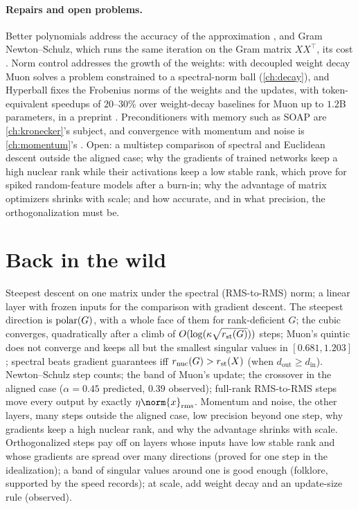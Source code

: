 \begin{refsection}
\paragraph{Repairs and open problems.} Better polynomials address the accuracy of the approximation \parencite{AmselEtAl2026}, and Gram Newton--Schulz, which runs the same iteration on the Gram matrix $XX^\top$, its cost \parencite{ZhangEtAl2026Gram}. Norm control addresses the growth of the weights: with decoupled weight decay Muon solves a problem constrained to a spectral-norm ball \parencite{ChenLiLiu2026,PethickEtAl2025} (\cref{ch:decay}), and Hyperball fixes the Frobenius norms of the weights and the updates, with token-equivalent speedups of $20$--$30\%$ over weight-decay baselines for Muon up to $1.2$B parameters, in a preprint \parencite{WenEtAl2026Hyperball}. Preconditioners with memory such as SOAP \parencite{VyasEtAl2025} are \cref{ch:kronecker}'s subject, and convergence with momentum and noise is \cref{ch:momentum}'s \parencite{LiHong2025,Kovalev2025}. Open: a multistep comparison of spectral and Euclidean descent outside the aligned case; why the gradients of trained networks keep a high nuclear rank while their activations keep a low stable rank, which \textcite{DavisDrusvyatskiy2025} prove for spiked random-feature models after a burn-in; why the advantage of matrix optimizers shrinks with scale; and how accurate, and in what precision, the orthogonalization must be.

\section{Back in the wild}\label{sec:spectral:back}

{Steepest descent on one matrix under the spectral (RMS-to-RMS) norm; a linear layer with frozen inputs for the comparison with gradient descent.}
{The steepest direction is $\operatorname{polar}(G)$, with a whole face of them for rank-deficient $G$; the cubic converges, quadratically after a climb of $O(\log(\kappa\sqrt{r_{\mathrm{st}}(G)}))$ steps; Muon's quintic does not converge and keeps all but the smallest singular values in $[0.681,1.203]$; spectral beats gradient guarantees iff $r_{\mathrm{nuc}}(G)>r_{\mathrm{st}}(X)$ (when $d_{\mathrm{out}}\ge d_{\mathrm{in}}$).}
{Newton--Schulz step counts; the band of Muon's update; the crossover in the aligned case ($\alpha=0.45$ predicted, $0.39$ observed); full-rank RMS-to-RMS steps move every output by exactly $\eta\norm{x}_{\rms}$.}
{Momentum and noise, the other layers, many steps outside the aligned case, low precision beyond one step, why gradients keep a high nuclear rank, and why the advantage shrinks with scale.}
{Orthogonalized steps pay off on layers whose inputs have low stable rank and whose gradients are spread over many directions (proved for one step in the idealization); a band of singular values around one is good enough (folklore, supported by the speed records); at scale, add weight decay and an update-size rule (observed).}


\end{refsection}
